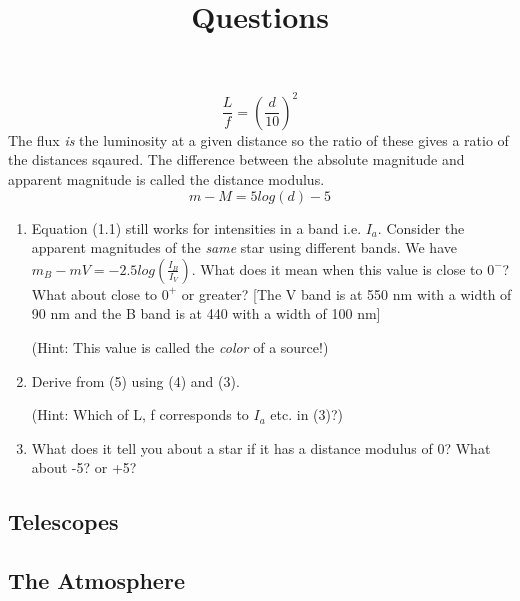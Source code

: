 \begin{equation}
\frac{L}{f} = (\frac{d}{10})^{2}
\end{equation}
The flux \textit{is} the luminosity at a given distance so the ratio of these gives a ratio of the distances sqaured. The difference between the absolute magnitude and apparent magnitude is called the distance modulus. 
\begin{equation}
m - M = 5log(d) -5
\end{equation}
\title{\large{Questions}}
\begin{enumerate}
	\item Equation (1.1) still works for intensities in a band i.e. $I_{a}$. Consider the apparent magnitudes of the \textit{same} star using different bands. We have $m_{B} - m{V} = -2.5log(\frac{I_{B}}{I_{V}})$. What does it mean when this value is close to $0^{-}$? What about close to $0^{+}$ or greater? [The V band is at 550 nm with a width of 90 nm and the B band is at 440 with a width of 100 nm] \par (Hint: This value is called the \textit{color} of a source!)
	\item Derive from (5) using (4) and (3).\par (Hint: Which of L, f corresponds to $I_a$ etc. in (3)?) 
	\item What does it tell you about a star if it has a distance modulus of 0? What about -5? or +5? 
\end{enumerate}














\subsection{Telescopes}
\subsection{The Atmosphere}
